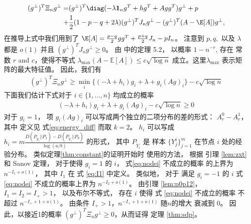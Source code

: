 \begin{align*}
    (g^{\perp})^T \Xi_n g^{\perp} 
    =& (g^{\perp})^T \diag( -\lambda \mathbf{1}_ng^T+hg^T + Agg^T) g^{\perp} + p \\
    +& \frac{1}{2}(1-p-q+2\lambda)(g^{\perp})^TJ_n g^{\perp}
    -(g^{\perp})^T(A-\E[A])g^{\perp},
\end{align*}
在推导上式中我们用到了 $\E[A] = \frac{p-q}{2}gg^T + \frac{p+q}{2}J_n - pI_n$。
注意到 $p,q,$ 以及 $\lambda$ 都是 $o(1)$ 并且
$(g^{\perp})^TJ_n g^{\perp}\ge 0$。
由 \citet{lei2015consistency} 中的定理 5.2，
以概率 $1-n^{-r}$, 存在
常数 $r$ and $c$，使得不等式 $\lambda_{\max}(A-\mathbb{E}[A]) \leq c\sqrt{\log n}$
成立。这里$\lambda_{\max}$ 表示矩阵的最大特征值。
因此，我们有
\begin{align}\label{eq:lastterm}
    (g^{\perp})^T \Xi_n g^{\perp} \geq \min_i\{(-\lambda + h_i) g_i+\lambda + g_i (Ag)_i \} - c \sqrt{\log n}
\end{align}
下面我们估计下式对于 $i\in\{1,\ldots,n\}$ 均成立的概率
\begin{align}\label{eq:nodei}
    (-\lambda + h_i) g_i+\lambda + g_i (Ag)_i  - c \sqrt{\log n}\ge 0
\end{align}
对于 $g_i=1$，
项 $g_i(Ag)_i$ 可以写成两个独立的二项分布的差的形式：
$A_r^0-A_r^1$，其中 定义见 式\eqref{eq:energy_diff} 而取 $k=2$。
$h_i$ 可以写成 $h_i=m \frac{D(P_{\widetilde{Y}_i} || P_1) - D(P_{\widetilde{Y}_i} || P_0) }{\log (a /b)}$
的形式，
其中 $P_{\widetilde{Y}_i}$ 是
样本 $\{Y^i_j\}^m_{j=1}$ 在节点 $i$ 处的经验分布。
类似定理\ref{thm:constant}的证明开始时
使用的方法，
根据 引理 \ref{lem:zxt} 和  Sanov 定理，
对于使得 $g_i=1$ 的 $i$， 
式\eqref{eq:nodei} 不成立的概率
的上界为
$n^{-I_1 + o(1)}$，
其中 $I_1$ 在 式 \eqref{eq:I1} 中定义。
类似地，
对于 满足 $g_i=-1$ 的  $i$
式 \eqref{eq:nodei} 不成立的概率上界为 
$n^{-I_2 + o(1)}$。
由引理 \ref{lem:p0p12}，$I_1=I_2=I_+>1$，
以及布尔不等式，  存在 $i$ 使得 式 \eqref{eq:nodei} 不成立的概率 不超过 $n^{-I_+ + 1 + o(1)}$。
由条件 $I_+>1$，$n^{-I_+ + 1 + o(1)}$ 随$n$的增大 衰减到 $0$。
 因此，以接近1的概率 $(g^{\perp})^T \Xi_n g^{\perp}\ge 0$，从而证得 定理 \ref{thm:sdp}。 

